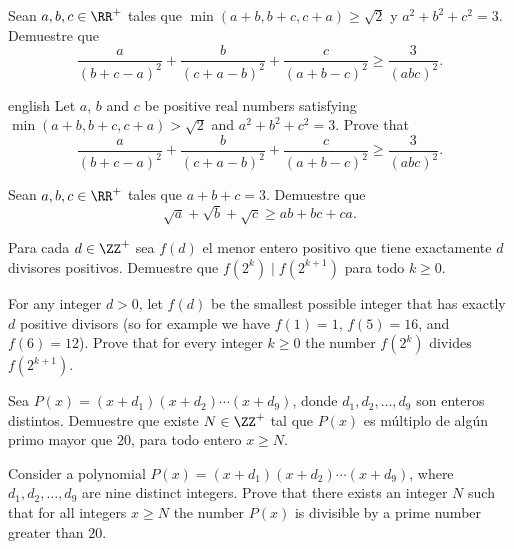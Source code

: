 \begin{probHR}[ISL 2011/A7]
  Sean $a,b,c\in\RR^+$ tales que $\min(a+b,b+c,c+a)\ge\sqrt2$ y $a^2+b^2+c^2=3$.
  Demuestre que
  \[
    \frac{a}{(b+c-a)^2}+\frac{b}{(c+a-b)^2}+\frac{c}{(a+b-c)^2}
    \ge\frac{3}{(abc)^2}.
  \]
  \begin{hint}
    \begin{otherlanguage*}{english}
      Let $a$, $b$ and $c$ be positive real numbers satisfying
      $\min(a+b,b+c,c+a)>\sqrt2$ and $a^2+b^2+c^2=3$. Prove that
      \[
        \frac{a}{(b+c-a)^2}+\frac{b}{(c+a-b)^2}+\frac{c}{(a+b-c)^2}
        \ge\frac{3}{(abc)^2}.
      \]
    \end{otherlanguage*}
  \end{hint}
\end{probHR}

\begin{probEG}
  Sean $a,b,c\in\RR^+$ tales que $a+b+c=3$. Demuestre que
  \[\sqrt{a}+\sqrt{b}+\sqrt{c}\ge ab+bc+ca.\]
\end{probEG}


\begin{probEG}[ISL 2011/N1]
  Para cada $d\in\ZZ^+$ sea $f(d)$ el menor entero positivo que tiene
  exactamente $d$ divisores positivos. Demuestre que $f(2^k)\mid f(2^{k+1})$
  para todo $k\ge 0$.
  \begin{hint}
    For any integer $d>0$, let $f(d)$ be the smallest possible integer that has
    exactly $d$ positive divisors (so for example we have $f(1)=1$, $f(5)=16$,
    and $f(6)=12$). Prove that for every integer $k\ge 0$ the number $f(2^k)$
    divides $f(2^{k+1})$.
  \end{hint}
\end{probEG}

\begin{probMG}[ISL 2011/N2]
  Sea $P(x)=(x+d_1)(x+d_2)\cdots(x+d_9)$, donde $d_1,d_2,\dots,d_9$ son enteros
  distintos. Demuestre que existe $N\in\ZZ^+$ tal que $P(x)$ es múltiplo de
  algún primo mayor que $20$, para todo entero $x\ge N$.
  \begin{hint}
    Consider a polynomial $P(x)=(x+d_1)(x+d_2)\cdots(x+d_9)$, where
    $d_1,d_2,\dots,d_9$ are nine distinct integers. Prove that there exists an
    integer $N$ such that for all integers $x\ge N$ the number $P(x)$ is
    divisible by a prime number greater than $20$.
  \end{hint}
\end{probMG}

